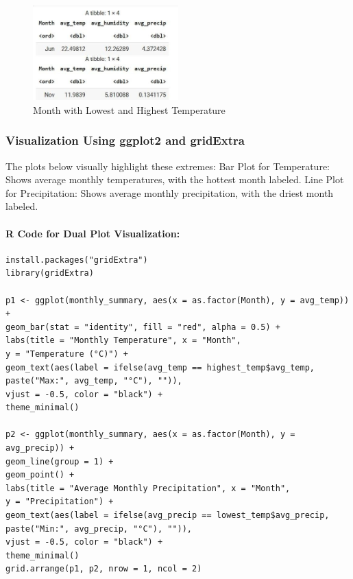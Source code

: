 \begin{figure}[h]
\centering
\includegraphics[width=0.5\textwidth]{figures/temp_highlow.jpg}
\caption{Month with Lowest and Highest Temperature}
\label{fig:extremes}
\end{figure}

\subsubsection*{Visualization Using ggplot2 and gridExtra}

The plots below visually highlight these extremes:  
Bar Plot for Temperature: Shows average monthly temperatures, with the hottest month labeled.  
Line Plot for Precipitation: Shows average monthly precipitation, with the driest month labeled.

\paragraph{R Code for Dual Plot Visualization:}

\begin{verbatim}
install.packages("gridExtra")
library(gridExtra)

p1 <- ggplot(monthly_summary, aes(x = as.factor(Month), y = avg_temp)) +
geom_bar(stat = "identity", fill = "red", alpha = 0.5) +
labs(title = "Monthly Temperature", x = "Month", 
y = "Temperature (°C)") +
geom_text(aes(label = ifelse(avg_temp == highest_temp$avg_temp,
paste("Max:", avg_temp, "°C"), "")),
vjust = -0.5, color = "black") +
theme_minimal()

p2 <- ggplot(monthly_summary, aes(x = as.factor(Month), y = avg_precip)) +
geom_line(group = 1) +
geom_point() +
labs(title = "Average Monthly Precipitation", x = "Month", 
y = "Precipitation") +
geom_text(aes(label = ifelse(avg_precip == lowest_temp$avg_precip,
paste("Min:", avg_precip, "°C"), "")),
vjust = -0.5, color = "black") +
theme_minimal()
grid.arrange(p1, p2, nrow = 1, ncol = 2)
\end{verbatim}

